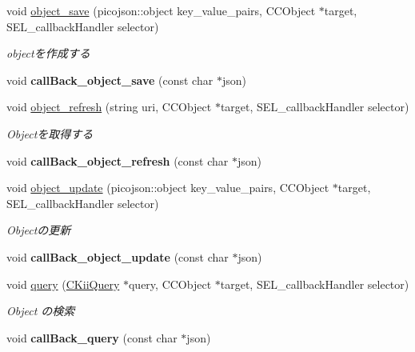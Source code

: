 \begin{DoxyCompactItemize}
\item 
void \hyperlink{class_c_kii_bucket_ad175f87e32cecfd03f98f22328bec5a6}{object\-\_\-save} (picojson\-::object key\-\_\-value\-\_\-pairs, C\-C\-Object $\ast$target, S\-E\-L\-\_\-callback\-Handler selector)
\begin{DoxyCompactList}\small\item\em objectを作成する \end{DoxyCompactList}\item 
\hypertarget{class_c_kii_bucket_a57b3dfbce914b0d8ef38145be32f79b3}{void {\bfseries call\-Back\-\_\-object\-\_\-save} (const char $\ast$json)}\label{class_c_kii_bucket_a57b3dfbce914b0d8ef38145be32f79b3}

\item 
void \hyperlink{class_c_kii_bucket_a04d59d67bce72418cbe2a11861b64e4f}{object\-\_\-refresh} (string uri, C\-C\-Object $\ast$target, S\-E\-L\-\_\-callback\-Handler selector)
\begin{DoxyCompactList}\small\item\em Objectを取得する \end{DoxyCompactList}\item 
\hypertarget{class_c_kii_bucket_ae5fd5045697030cdce7d004fb7e26bc4}{void {\bfseries call\-Back\-\_\-object\-\_\-refresh} (const char $\ast$json)}\label{class_c_kii_bucket_ae5fd5045697030cdce7d004fb7e26bc4}

\item 
void \hyperlink{class_c_kii_bucket_a1b61cde61e0b90e99e85e859eea22966}{object\-\_\-update} (picojson\-::object key\-\_\-value\-\_\-pairs, C\-C\-Object $\ast$target, S\-E\-L\-\_\-callback\-Handler selector)
\begin{DoxyCompactList}\small\item\em Objectの更新 \end{DoxyCompactList}\item 
\hypertarget{class_c_kii_bucket_aca9a0b2e3caf7495711312828632bd8e}{void {\bfseries call\-Back\-\_\-object\-\_\-update} (const char $\ast$json)}\label{class_c_kii_bucket_aca9a0b2e3caf7495711312828632bd8e}

\item 
void \hyperlink{class_c_kii_bucket_a8a3f690fc0a2e1d9ba0e81a53a92ef04}{query} (\hyperlink{class_c_kii_query}{C\-Kii\-Query} $\ast$query, C\-C\-Object $\ast$target, S\-E\-L\-\_\-callback\-Handler selector)
\begin{DoxyCompactList}\small\item\em Object の検索 \end{DoxyCompactList}\item 
\hypertarget{class_c_kii_bucket_aa36a27887af9177dc7809da7b723bb47}{void {\bfseries call\-Back\-\_\-query} (const char $\ast$json)}\label{class_c_kii_bucket_aa36a27887af9177dc7809da7b723bb47}

\end{DoxyCompactItemize}
